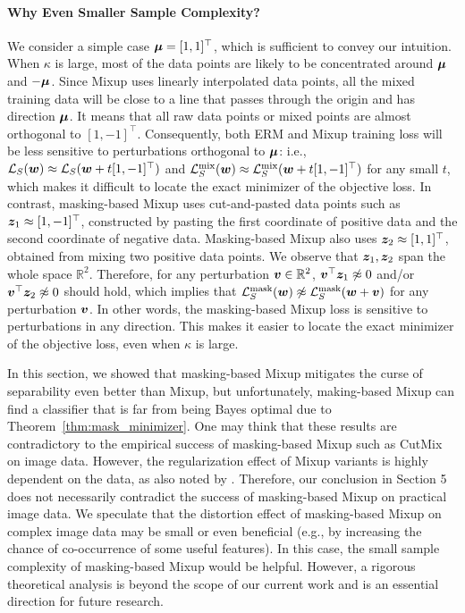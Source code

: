 \paragraph{Why Even Smaller Sample Complexity?} We consider a simple case ${\bm{\mu}} = [1,1]^\top$, which is sufficient to convey our intuition. When $\kappa$ is large, most of the data points are likely to be concentrated around ${\bm{\mu}}$ and $-{\bm{\mu}}$. Since Mixup uses linearly interpolated data points, all the mixed training data will be close to a line that passes through the origin and has direction ${\bm{\mu}}$. It means that all raw data points or mixed points are almost orthogonal to $[1,-1]^\top$. Consequently, both ERM and Mixup training loss will be less sensitive to perturbations orthogonal to ${\bm{\mu}}$: i.e., $\mathcal{L}_S({\bm{w}} ) \approx \mathcal{L}_S({\bm{w}} + t[1,-1]^\top)$ and $\mathcal{L}_S^\mathrm{mix}({\bm{w}} ) \approx \mathcal{L}_S^\mathrm{mix}({\bm{w}} + t[1,-1]^\top)$ for any small $t$, which makes it difficult to locate the exact minimizer of the objective loss.
In contrast, masking-based Mixup uses cut-and-pasted data points such as ${\bm{z}}_1\approx [1,-1]^\top$, constructed by pasting the first coordinate of positive data and the second coordinate of negative data. Masking-based Mixup also uses ${\bm{z}}_2 \approx [1,1]^\top$, obtained from mixing two positive data points. We observe that ${{\bm{z}}_1, {\bm{z}}_2 }$ span the whole space $\mathbb{R}^2$. Therefore, for any perturbation ${\bm{v}} \in \mathbb{R}^2$, ${\bm{v}}^\top {\bm{z}}_1 \not \approx 0$ and/or ${\bm{v}}^\top {\bm{z}}_2 \not \approx 0$ should hold, which implies that $\mathcal{L}_S^\mathrm{mask}({\bm{w}} ) \not \approx \mathcal{L}_S^\mathrm{mask}({\bm{w}} + {\bm{v}})$ for any perturbation ${\bm{v}}$. In other words, the masking-based Mixup loss is sensitive to perturbations in any direction. This makes it easier to locate the exact minimizer of the objective loss, even when $\kappa$ is large.

In this section, we showed that masking-based Mixup mitigates the curse of separability even better than Mixup, but unfortunately, making-based Mixup can find a classifier that is far from being Bayes optimal due to Theorem~\ref{thm:mask_minimizer}. One may think that these results are contradictory to the empirical success of masking-based Mixup such as CutMix~\citep{yun2019cutmix} on image data. However, the regularization effect of Mixup variants is highly dependent on the data, as also noted by \citet{parkunified}. Therefore, our conclusion in Section 5 does not necessarily contradict the success of masking-based Mixup on practical image data. We speculate that the distortion effect of masking-based Mixup on complex image data may be small or even beneficial (e.g., by increasing the chance of co-occurrence of some useful features). In this case, the small sample complexity of masking-based Mixup would be helpful. However, a rigorous theoretical analysis is beyond the scope of our current work and is an essential direction for future research.